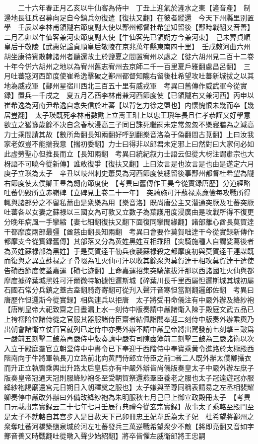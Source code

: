 　　二十六年春正月乙亥以牛仙客為侍中　丁丑上迎氣於滻水之東【滻音產】　制邊地長征兵召募向足自今鎮兵勿復遣【復扶又翻】在彼者縱還　今天下州縣里别置學　壬辰以李林甫領隴右節度副大使以鄯州都督杜希望知留後【鄯時戰翻又音善】二月乙卯以牛仙客兼河東節度副大使【牛仙客先已領朔方今兼河東】　己未葬貞順皇后于敬陵【武惠妃諡貞順皇后敬陵在京兆萬年縣東南四十里】　壬戌敇河曲六州胡坐康待賓散隸諸州者聽還故土於鹽夏之間置宥州以處之【徙六胡州見二百十二卷十年今併六胡州之地以為宥州舊志宥州去京師二千一百里夏戶雅翻處昌呂翻】　三月吐蕃寇河西節度使崔希逸擊破之鄯州都督知隴右留後杜希望攻吐蕃新城拔之以其地為威戎軍【鄯州星宿川西北三百五十里有威戎軍　考異曰舊傳作威武軍今從實録】置兵一千戌之　夏五月乙酉李林甫兼河西節度使【已領隴右又兼河西】丙申以崔希逸為河南尹希逸自念失信於吐蕃【以背乞力徐之盟也】内懷愧恨未幾而卒【幾居豈翻】　太子瑛既死李林甫數勸上立夀王瑁上以忠王璵年長且仁孝恭謹又好學意欲立之猶豫歲餘不决自念春秋浸高三子同日誅死繼嗣未定常忽忽不樂寢膳為之減高力士乘間請其故【數所角翻長知兩翻好呼到翻樂音洛為于偽翻間古莧翻】上曰汝我家老奴豈不能揣我意【揣初委翻】力士曰得非以郎君未定邪上曰然對曰大家何必如此虚勞聖心但推長而立【長知兩翻　考異曰統紀叙力士語云但從大枒注謂肅宗也大枒語不可曉今從新傳】誰敢復爭【復扶又翻】上曰汝言是也汝言是也由是遂定六月庚子立璵為太子　辛丑以岐州刺史蕭炅為河西節度使總留後事鄯州都督杜希望為隴右節度使太僕卿王昱為劒南節度使　【考異曰舊傳作王昊今從實録唐歷】分道經略吐蕃仍毁所立赤嶺碑【立碑見上卷二十一年】　突騎施可汗蘇禄素亷儉每攻戰所得輒與諸部分之不留私蓄由是衆樂為用【樂音洛】既尚唐公主又潜通突厥及吐蕃突厥吐蕃各以女妻之蘇禄以三國女為可敦又立數子為葉護用度浸廣由是攻戰所得不復更分晚年病風一手攣縮【妻七細翻復扶又翻下面復同攣閭緣翻】諸部離心酋長莫賀逹干都摩度兩部最彊【酋慈由翻長知兩翻　考異曰會要作莫賀咄逹干今從實録新傳作都摩支今從實録舊傳】其部落又分為黄姓黑姓互相乖阻【突騎施種人自謂娑葛後者為黄姓蘇禄部為黑姓】于是莫賀逹干勒兵夜襲蘇禄殺之都摩度初與莫賀逹干連謀既而復與之異立蘇禄之子骨啜為吐火仙可汗以收其餘衆與莫賀逹干相攻莫賀逹干遣使告磧西節度使蓋嘉運【磧七迹翻】上命嘉運招集突騎施拔汗那以西諸國吐火仙與都摩度據碎葉城黑姓可汗爾微特勒據怛邏斯城【碎葉川長千里西屬怛邏斯城其城初屬石國石常分兵鎮之蓋古盍翻騎奇寄翻可從刋入聲汗音寒怛當割翻邏郎佐翻　考異曰唐歷作怛邏斯今從實録】相與連兵以拒唐　太子將受冊命儀注有中嚴外辦及絳紗袍【唐制皇帝大祀致齋之日晝漏上水一刻侍中版奏請中嚴諸衛入陳于殿庭文武五品已上袴褶陪位諸侍從之官服其器服諸侍臣齋者結佩詣閤奉迎二刻侍中版奏外辦乘輿乃出朝會諸衛立仗百官就列已定侍中亦奏外辦不請中嚴皇帝將出駕發前七刻擊三皷爲一嚴前五刻擊二皷為再嚴侍中版奏請中嚴有司陳鹵簿前二刻擊三皷為三嚴諸衛以次入立于殿庭羣官立朝堂侍中中書令已下奉迎于西階侍中奉寶乘黄令進路於太極殿西階南向于牛將軍執長刀立路前北向黄門侍郎立侍臣之前□者二人既外辦太僕卿攝衣而升正立執轡乘輿出升路太后皇后亦有中嚴外辦皆尚儀版奏皇太子中嚴外辦左庶子版奏皇帝冠通天冠則服絳紗袍冬至受朝賀祭還燕羣臣養老之服也太子冠遠遊冠亦服絳紗袍謁廟還宫元日朔日入朝釋奠之服也】太子嫌與至尊同稱表請易之左丞相裴耀卿奏停中嚴改外辦曰外備改絳紗袍為朱明服秋七月己巳上御宣政殿冊太子　【考異曰元載肅宗實録云二十七年七月壬辰行典禮今從玄宗實録】故事太子乘輅至殿門至是太子不就輅自其宫步入是日赦天下己卯冊忠王妃韋氏為太子妃　杜希望將鄯州之衆奪吐蕃河橋築鹽泉城於河左吐蕃發兵三萬逆戰希望衆少不敵【將即亮翻又音如字鄯音善又時戰翻吐從暾入聲少始紹翻】將卒皆懼左威衛郎將王忠嗣